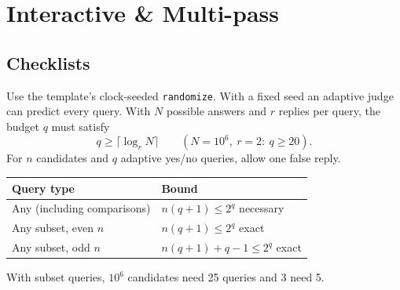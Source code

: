\section{Interactive \& Multi-pass}
\threelevels
{}

\subsection{Checklists}
\label{interactivecheck}
{\footnotesize\tightdisplay
Use the template's clock-seeded \texttt{randomize}. With a fixed seed an adaptive judge can predict every query.
With $N$ possible answers and $r$ replies per query, the budget $q$ must satisfy
\[ q \ge \lceil\log_r N\rceil \qquad (N=10^6,\ r=2:\ q\ge20). \]
For $n$ candidates and $q$ adaptive yes/no queries, allow one false reply.
\par\begin{tabular}{@{}ll@{}}
\toprule
Query type & Bound \\
\midrule
Any (including comparisons) & $n(q+1)\le2^q$ necessary \\
Any subset, even $n$ & $n(q+1)\le2^q$ exact \\
Any subset, odd $n$ & $n(q+1)+q-1\le2^q$ exact \\
\bottomrule
\end{tabular}\par
With subset queries, $10^6$ candidates need 25 queries and 3 need 5.
}
